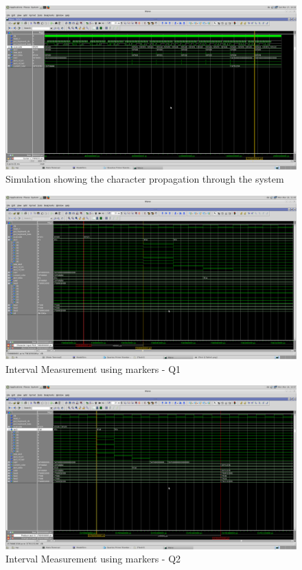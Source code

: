 \documentclass[11pt,a4paper,titlepage,oneside]{article}
\begin{document}
\begin{figure}[h!]
	\centering
	\includegraphics[width=1.0\linewidth]{task3 - 4 Propagation.png} %
	\caption{Simulation showing the character propagation through the system}
\end{figure}


\begin{figure}[ht!]
	\centering
	\includegraphics[width=1.0\linewidth]{FirstQ - Table1.png} 
	\caption{Interval Measurement using markers - Q1}
\end{figure}

\begin{figure}[ht!]
	\centering
	\includegraphics[width=1.0\linewidth]{SecondQ - Table1.png} 
	\caption{Interval Measurement using markers - Q2}
\end{figure}
\end{document}
